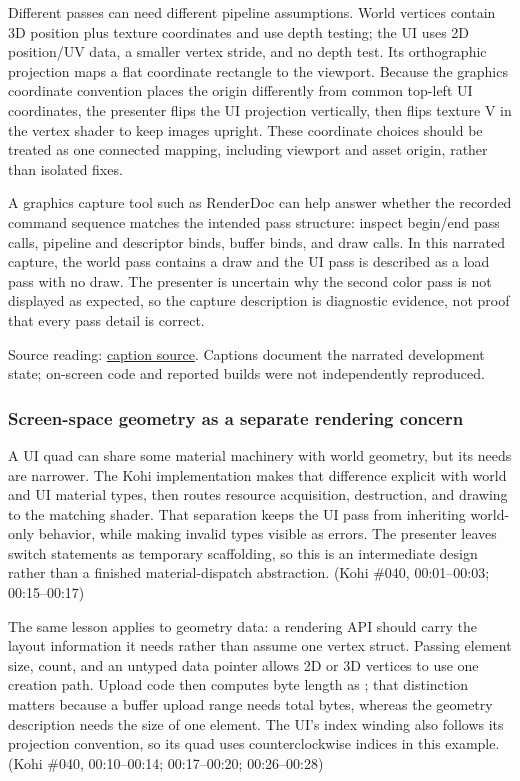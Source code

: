 Different passes can need different pipeline assumptions. World vertices contain 3D position plus texture coordinates and use depth testing; the UI uses 2D position/UV data, a smaller vertex stride, and no depth test. Its orthographic projection maps a flat coordinate rectangle to the viewport. Because the graphics coordinate convention places the origin differently from common top-left UI coordinates, the presenter flips the UI projection vertically, then flips texture V in the vertex shader to keep images upright. These coordinate choices should be treated as one connected mapping, including viewport and asset origin, rather than isolated fixes.

A graphics capture tool such as RenderDoc can help answer whether the recorded command sequence matches the intended pass structure: inspect begin/end pass calls, pipeline and descriptor binds, buffer binds, and draw calls. In this narrated capture, the world pass contains a draw and the UI pass is described as a load pass with no draw. The presenter is uncertain why the second color pass is not displayed as expected, so the capture description is diagnostic evidence, not proof that every pass detail is correct.

Source reading: \href{https://www.youtube.com/watch?v=sXuf_wHIHgM}{caption source}. Captions document the narrated development state; on-screen code and reported builds were not independently reproduced.

\subsubsection{Screen-space geometry as a separate rendering concern}\label{06-engine-ii-ch026-screen-space-geometry-as-a-separate-rendering-concern}

\hypertarget{06-engine-ii-ch026-screen-space-geometry-as-a-separate-rendering-concern}{}

A UI quad can share some material machinery with world geometry, but its needs are narrower. The Kohi implementation makes that difference explicit with world and UI material types, then routes resource acquisition, destruction, and drawing to the matching shader. That separation keeps the UI pass from inheriting world-only behavior, while making invalid types visible as errors. The presenter leaves switch statements as temporary scaffolding, so this is an intermediate design rather than a finished material-dispatch abstraction. (Kohi \#040, 00:01--00:03; 00:15--00:17)

The same lesson applies to geometry data: a rendering API should carry the layout information it needs rather than assume one vertex struct. Passing element size, count, and an untyped data pointer allows 2D or 3D vertices to use one creation path. Upload code then computes byte length as ; that distinction matters because a buffer upload range needs total bytes, whereas the geometry description needs the size of one element. The UI's index winding also follows its projection convention, so its quad uses counterclockwise indices in this example. (Kohi \#040, 00:10--00:14; 00:17--00:20; 00:26--00:28)

